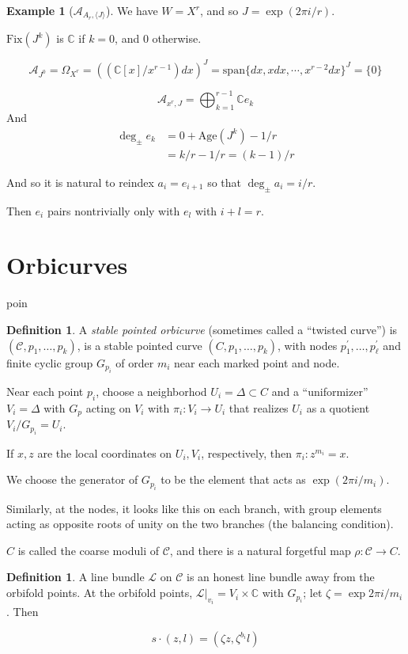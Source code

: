\documentclass{amsart}
\theoremstyle{definition}
\newtheorem{definition}[dummy]{Definition}
\newtheorem{example}[dummy]{Example}
\newcommand{\C}{\mathbb{C}}
\newcommand{\Age}{\text{Age}}
\newcommand{\Fix}{\text{Fix}}
\begin{document}
\begin{example}[$\mathcal{A}_{A_r,\langle J\rangle}$]
We have $W=X^r$, and so $J=\exp(2\pi i/r)$.

$\Fix(J^k)$ is $\C$ if $k=0$, and $0$ otherwise.

$$\mathcal{A}_{J^0}=\Omega_{X^r}=((\C[x]/x^{r-1})dx)^{J}=\text{span}\{dx, xdx,\cdots, x^{r-2}dx\}^J=\{0\}$$

$$\mathcal{A}_{x^r, J}=\bigoplus_{k=1}^{r-1} \C e_k$$
And
\begin{align*}
\deg_\pm e_k&=0+\Age(J^k)-1/r \\
&=k/r-1/r=(k-1)/r
\end{align*}

And so it is natural to reindex $a_i=e_{i+1}$ so that $\deg_\pm a_i=i/r$.

Then $e_i$ pairs nontrivially only with $e_l$ with $i+l=r$.


\end{example}

\section{Orbicurves}poin

\begin{definition}
A \emph{stable pointed orbicurve} (sometimes called a ``twisted curve'') is $(\mathcal{C},p_1,\dots, p_k)$, is a stable pointed curve $(C, p_1,\dots, p_k)$, with nodes $p_1^\prime,\dots,p_\ell^\prime$ and finite cyclic group $G_{p_i}$ of order $m_i$ near each marked point and node.

Near each point $p_i$, choose a neighborhod $U_i=\Delta\subset C$ and a ``uniformizer'' $V_i=\Delta$ with $G_p$ acting on $V_i$ with $\pi_i:V_i\to U_i$ that realizes $U_i$ as a quotient $V_i/G_{p_i}=U_i$.

If $x,z$ are the local coordinates on $U_i, V_i$, respectively, then $\pi_i:z^{m_i}=x$.

We choose the generator of $G_{p_i}$ to be the element that acts as $\exp(2\pi i/m_i)$.

Similarly, at the nodes, it looks like this on each branch, with group elements acting as opposite roots of unity on the two branches (the balancing condition).
\end{definition}

$C$ is called the coarse moduli of $\mathcal{C}$, and there is a natural forgetful map $\rho:\mathcal{C}\to C$.

\begin{definition}
A line bundle $\mathcal{L}$ on $\mathcal{C}$ is an honest line bundle away from the orbifold points.  At the orbifold points, $\mathcal{L}|_{v_i}=V_i\times\C$ with $G_{p_i}$; let $\zeta=\exp{2\pi i/m_i}$.  Then

$$s\cdot (z,l)=(\zeta z, \zeta^{b_i}l)$$

\end{definition}
\end{document}
